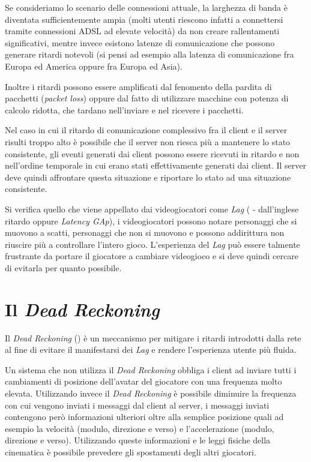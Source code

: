 \documentclass[a4paper,11pt]{article}
\begin{document}
Se consideriamo lo scenario delle connessioni attuale, la larghezza di banda \`e diventata sufficientemente ampia (molti utenti riescono infatti a connettersi tramite connessioni ADSL ad elevate velocit\`a) da non creare rallentamenti significativi, mentre invece esistono latenze di comunicazione che possono generare ritardi notevoli (si pensi ad esempio alla latenza di comunicazione fra Europa ed America oppure fra Europa ed Asia).

Inoltre i ritardi possono essere amplificati dal fenomento della pardita di pacchetti (\emph{packet loss}) oppure dal fatto di utilizzare macchine con potenza di calcolo ridotta, che tardano nell'inviare e nel ricevere i pacchetti.

Nel caso in cui il ritardo di comunicazione complessivo fra il client e il server risulti troppo alto \`e possibile che il server non riesca pi\`u a mantenere lo stato consistente, gli eventi generati dai client possono essere ricevuti in ritardo e non nell'ordine temporale in cui erano stati effettivamente generati dai client. Il server deve quindi affrontare questa situazione e riportare lo stato ad una situazione consistente.

Si verifica quello che viene appellato dai videogiocatori come \emph{Lag} (\cite{wiki2} - dall'inglese ritardo oppure \emph{Latency GAp}), i videogiocatori possono notare personaggi che si muovono a scatti, personaggi che non si muovono e possono addirittura non riuscire pi\`u a controllare l'intero gioco. L'esperienza del \emph{Lag} pu\`o essere talmente frustrante da portare il giocatore a cambiare videogioco e si deve quindi cercare di evitarla per quanto possibile.



\section{Il \emph{Dead Reckoning}}

Il \emph{Dead Reckoning} (\cite{rif1}) \`e un meccanismo per mitigare i ritardi introdotti dalla rete al fine di evitare il manifestarsi dei \emph{Lag} e rendere l'esperienza utente pi\`u fluida.

Un sistema che non utilizza il \emph{Dead Reckoning} obbliga i client ad inviare tutti i cambiamenti di posizione dell'avatar del giocatore con una frequenza molto elevata. Utilizzando invece il \emph{Dead Reckoning} \`e possibile diminuire la frequenza con cui vengono inviati i messaggi dal client al server, i messaggi inviati contengono per\`o informazioni ulteriori oltre alla semplice posizione quali ad esempio la velocit\`a (modulo, direzione e verso) e l'accelerazione (modulo, direzione e verso). Utilizzando queste informazioni e le leggi fisiche della cinematica \`e possibile prevedere gli spostamenti degli altri giocatori.
\end{document}
